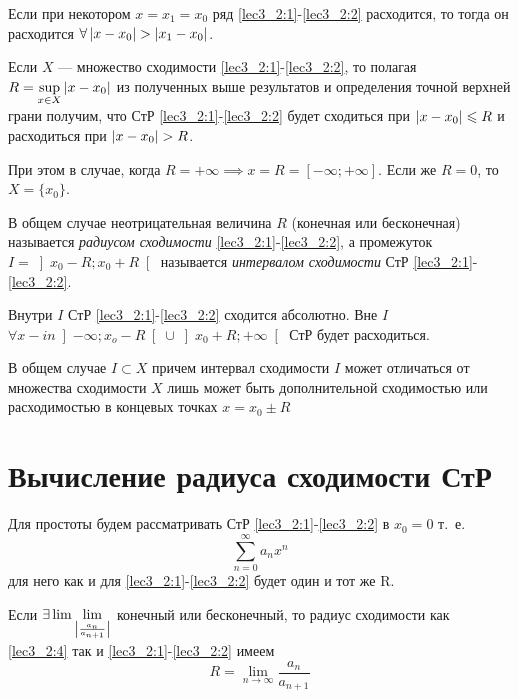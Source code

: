 \documentclass[../../main.tex]{subfiles}
\begin{document}
\begin{crl*}
	Если при некотором $x=x_1=x_0$ ряд \ref{lec3_2:1}-\ref{lec3_2:2}
	 расходится, то тогда он расходится $\forall \left|{x-x_0}\right| > \left|{x_1-x_0}\right|$.
\end{crl*}	
\begin{rem}
	Если $X$ --- множество сходимости \ref{lec3_2:1}-\ref{lec3_2:2}, 
	то полагая $R=\underset{x\in X}{\sup} \left|{x-x_0}\right|$ из полученных выше 
	результатов и определения точной верхней грани получим, 
	что СтР \ref{lec3_2:1}-\ref{lec3_2:2}
	будет сходиться при $\left|{x-x_0}\right|\leqslant R$ и расходиться при $\abs{x-x_0}>R$.
	
	При этом в случае, когда $R=+\infty \implies 
	x=R=\left[-\infty;+\infty\right]$.
	Если же $R=0$, то $X=\{x_0\}$.	
\end{rem}	
В общем  случае неотрицательная величина $R$ (конечная или бесконечная) 
называется \emph{радиусом сходимости}  \ref{lec3_2:1}-\ref{lec3_2:2}, а 
промежуток $I=\left]x_0-R;x_0+R\right[$ называется 
\emph{интервалом сходимости} 
СтР \ref{lec3_2:1}-\ref{lec3_2:2}.
	
Внутри $I$ СтР \ref{lec3_2:1}-\ref{lec3_2:2} сходится абсолютно. Вне $I$
$\forall x-in\left]-\infty;x_o-R\right[\cup\left]x_0+R;+\infty\right[$
СтР будет расходиться.
	 
В общем случае $I\subset X$ причем интервал сходимости $I$ может
отличаться от множества сходимости $X$ лишь может быть дополнительной 
сходимостью или расходимостью в концевых точках $x=x_0\pm R$
	 
\section{Вычисление радиуса сходимости СтР}
	
Для простоты будем рассматривать СтР \ref{lec3_2:1}-\ref{lec3_2:2} в $x_0=0$
т.~е. 
\begin{equation}\label{lec3_2:4}
	\sum_{n=0}^{\infty}a_nx^n
\end{equation}
для него как и для \ref{lec3_2:1}-\ref{lec3_2:2} будет один и тот же
R.
\begin{thm}
	Если $\exists \lim\lim\limits_{\left|{\frac{a_n}{a_{n+1}}}\right|}$ конечный или 
	бесконечный, то радиус сходимости как \ref{lec3_2:4} так и 
	\ref{lec3_2:1}-\ref{lec3_2:2} имеем
	\begin{equation}
		R=\lim\limits_{n\rightarrow\infty}\frac{a_n}{a_{n+1}}
	\end{equation}
\end{thm}	
\end{document}
